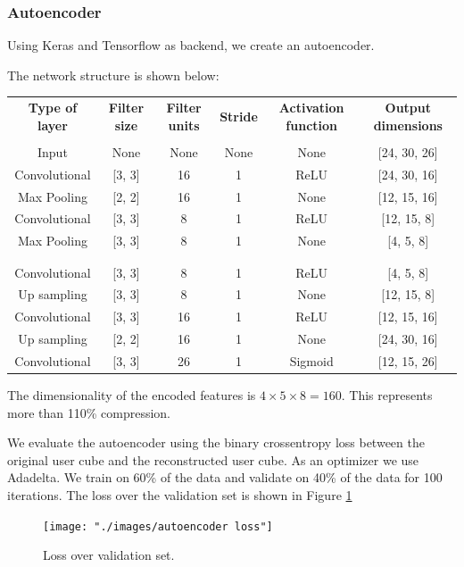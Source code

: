 \documentclass{article}
\begin{document}
\subsubsection{Autoencoder}
Using Keras and Tensorflow as backend, we create an autoencoder. 

The network structure is shown below:

\begin{tabular}{|c|c|c|c|c|c|}
\textbf{Type of layer} & \textbf{Filter size} & \textbf{Filter units} & \textbf{Stride} & \textbf{Activation function} & \textbf{Output dimensions} \\
\\
Input & None & None & None & None  & [24, 30, 26]\\
Convolutional & [3, 3] & 16 & 1 & ReLU  & [24, 30, 16]\\
Max Pooling & [2, 2] & 16 & 1 & None  & [12, 15, 16]\\
Convolutional & [3, 3] & 8 & 1 & ReLU  & [12, 15, 8]\\
Max Pooling & [3, 3] & 8 & 1 & None  & [4, 5, 8]\\
\\\\
Convolutional & [3, 3] & 8 & 1 & ReLU  & [4, 5, 8]\\
Up sampling & [3, 3] & 8 & 1 & None  & [12, 15, 8]\\
Convolutional & [3, 3] & 16 & 1 & ReLU  & [12, 15, 16]\\
Up sampling & [2, 2] & 16 & 1 & None  & [24, 30, 16]\\
Convolutional & [3, 3] & 26 & 1 & Sigmoid  & [12, 15, 26]\\
\end{tabular}

The dimensionality of the encoded features is $4 \times 5 \times 8 = 160$. This represents more than 110\% compression. 

We evaluate the autoencoder using the binary crossentropy loss between the original user cube and the reconstructed user cube. As an optimizer we use Adadelta. We train on 60\% of the data and validate on 40\% of the data for 100 iterations. The loss over the validation set is shown in Figure \ref{fig:clustering/loss}

\begin{figure}[H]
  \centering
  \texttt{[image: "./images/autoencoder loss"]}
  \caption{Loss over validation set.}
  \label{fig:clustering/loss}
\end{figure}
\end{document}
